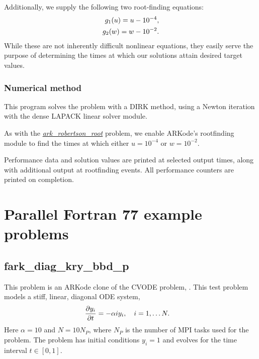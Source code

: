 \documentclass[letterpaper,10pt,english]{sphinxmanual}
\begin{document}
Additionally, we supply the following two root-finding equations:
\begin{gather}
\begin{split}g_1(u) = u - 10^{-4}, \\
g_2(w) = w - 10^{-2}.\end{split}\notag
\end{gather}
While these are not inherently difficult nonlinear equations, they
easily serve the purpose of determining the times at which our
solutions attain desired target values.


\subsection{Numerical method}
\label{f77_serial:id3}
This program solves the problem with a DIRK method, using a Newton
iteration with the dense LAPACK linear solver module.

As with the {\hyperref[c_serial:ark-robertson-root]{\emph{ark\_robertson\_root}}} problem, we enable ARKode's
rootfinding module to find the times at which
either $u=10^{-4}$ or $w=10^{-2}$.

Performance data and solution values are printed at
selected output times, along with additional output at rootfinding
events.  All performance counters are printed on completion.


\chapter{Parallel Fortran 77 example problems}
\label{f77_parallel::doc}\label{f77_parallel:parallel-f77}\label{f77_parallel:parallel-fortran-77-example-problems}

\section{fark\_diag\_kry\_bbd\_p}
\label{f77_parallel:fark-diag-kry-bbd-p}\label{f77_parallel:id1}
This problem is an ARKode clone of the CVODE problem,
.  This test problem models a stiff, linear,
diagonal ODE system,
\begin{gather}
\begin{split}\frac{\partial y_i}{\partial t} &= -\alpha i y_i, \quad i=1,\ldots N.\end{split}\notag
\end{gather}
Here $\alpha=10$ and $N=10 N_P$, where $N_P$ is the
number of MPI tasks used for the problem.  The problem has initial
conditions $y_i=1$ and evolves for the time interval $t\in [0,1]$.
\end{document}
